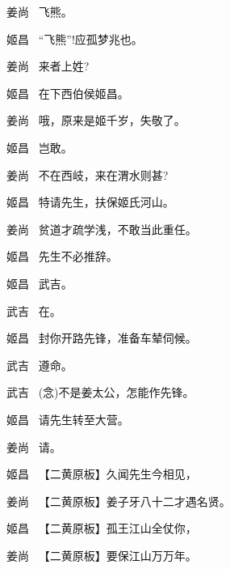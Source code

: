 {姜尚\hspace{30pt}~ 飞熊。

姬昌\hspace{30pt}~ ``飞熊''!应孤梦兆也。

姜尚\hspace{30pt}~ 来者上姓?

姬昌\hspace{30pt}~ 在下西伯侯姬昌。

姜尚\hspace{30pt}~ 哦，原来是姬千岁，失敬了。

姬昌\hspace{30pt}~ 岂敢。

姜尚\hspace{30pt}~ 不在西岐，来在渭水则甚?

姬昌\hspace{30pt}~ 特请先生，扶保姬氏河山。

姜尚\hspace{30pt}~ 贫道才疏学浅，不敢当此重任。

姬昌\hspace{30pt}~ 先生不必推辞。

姬昌\hspace{30pt}~ 武吉。

武吉\hspace{30pt}~ 在。

姬昌\hspace{30pt}~ 封你开路先锋，准备车辇伺候。

武吉\hspace{30pt}~ 遵命。

武吉\hspace{30pt}~ ({\akai 念})不是姜太公，怎能作先锋。

姬昌\hspace{30pt}~ 请先生转至大营。

姜尚\hspace{30pt}~ 请。

姬昌\hspace{30pt}~ 【{\akai 二黄原板}】久闻先生今相见，

姜尚\hspace{30pt}~ 【{\akai 二黄原板}】姜子牙八十二才遇名贤。

姬昌\hspace{30pt}~ 【{\akai 二黄原板}】孤王江山全仗你，

姜尚\hspace{30pt}~ 【{\akai 二黄原板}】要保江山万万年。

\vspace{5pt}

}
